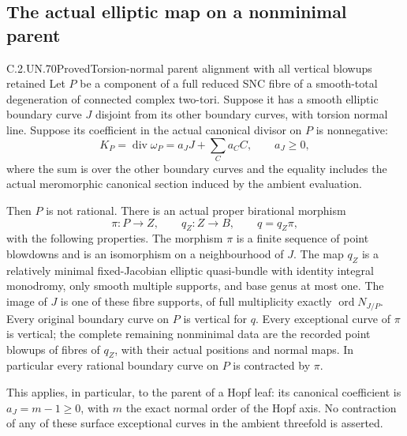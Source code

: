 \subsection{The actual elliptic map on a nonminimal parent}

\begin{statement}{C.2.UN.70}{Proved}{Torsion-normal parent alignment with all vertical blowups retained}
Let \(P\) be a component of a full reduced SNC fibre of
a smooth-total degeneration of connected complex two-tori.
Suppose it has a smooth elliptic boundary curve \(J\)
disjoint from its other boundary curves, with torsion
normal line. Suppose its coefficient in the actual
canonical divisor on \(P\) is nonnegative:
\[
 K_P=\operatorname{div}\omega_P
       =a_JJ+\sum_C a_C C,\qquad a_J\ge0 ,
 \tag{C.NP.1}
\]
where the sum is over the other boundary curves and
the equality includes the actual meromorphic canonical
section induced by the ambient evaluation.

Then \(P\) is not rational. There is an actual proper
birational morphism
\[
 \pi:P\longrightarrow Z,\qquad q_Z:Z\longrightarrow B,
                    \qquad q=q_Z\pi ,
 \tag{C.NP.2}
\]
with the following properties. The morphism \(\pi\)
is a finite sequence of point blowdowns and is an
isomorphism on a neighbourhood of \(J\). The map
\(q_Z\) is a relatively minimal fixed-Jacobian elliptic
quasi-bundle with identity integral monodromy, only
smooth multiple supports, and base genus at most one.
The image of \(J\) is one of these fibre supports,
of full multiplicity exactly
\(\operatorname{ord}N_{J/P}\).
Every original boundary curve on \(P\) is vertical
for \(q\). Every exceptional curve of \(\pi\) is
vertical; the complete remaining nonminimal data
are the recorded point blowups of fibres of \(q_Z\),
with their actual positions and normal maps.
In particular every rational boundary curve on
\(P\) is contracted by \(\pi\).

This applies, in particular, to the parent of a
Hopf leaf: its canonical coefficient is
\(a_J=m-1\ge0\), with \(m\) the exact normal
order of the Hopf axis. No contraction of any
of these surface exceptional curves in the
ambient threefold is asserted.
\end{statement}

